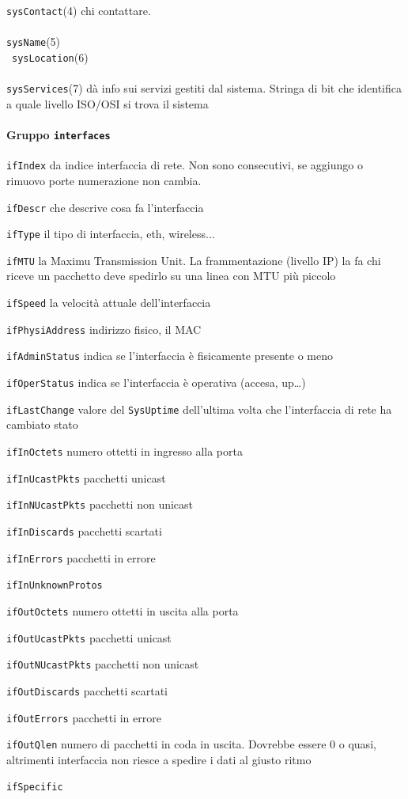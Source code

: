 \documentclass[10pt]{book}
\begin{document}
\texttt{sysContact}(4) chi contattare.\\\\
\texttt{sysName}(5)\\\
\texttt{sysLocation}(6)\\\\
\texttt{sysServices}(7) dà info sui servizi gestiti dal sistema. Stringa di bit che identifica a quale livello ISO/OSI si trova il sistema
\paragraph{Gruppo \texttt{interfaces}}\begin{list}{}{Informazioni sulle interfacce di rete}
	\item \texttt{ifIndex} da indice interfaccia di rete. Non sono consecutivi, se aggiungo o rimuovo porte numerazione non cambia.
	\item \texttt{ifDescr} che descrive cosa fa l'interfaccia 
	\item \texttt{ifType} il tipo di interfaccia, eth, wireless...
	\item \texttt{ifMTU} la Maximu Transmission Unit. La frammentazione (livello IP) la fa chi riceve un pacchetto deve spedirlo su una linea con MTU più piccolo
	\item \texttt{ifSpeed} la velocità attuale dell'interfaccia
	\item \texttt{ifPhysiAddress} indirizzo fisico, il MAC
	\item \texttt{ifAdminStatus} indica se l'interfaccia è fisicamente presente o meno
	\item \texttt{ifOperStatus} indica se l'interfaccia è operativa (accesa, up\ldots)
	\item \texttt{ifLastChange} valore del \texttt{SysUptime} dell'ultima volta che l'interfaccia di rete ha cambiato stato
	\item \texttt{ifInOctets} numero ottetti in ingresso alla porta
	\item \texttt{ifInUcastPkts} pacchetti unicast
	\item \texttt{ifInNUcastPkts} pacchetti non unicast
	\item \texttt{ifInDiscards} pacchetti scartati
	\item \texttt{ifInErrors} pacchetti in errore
	\item \texttt{ifInUnknownProtos}
	\item \texttt{ifOutOctets} numero ottetti in uscita alla porta
	\item \texttt{ifOutUcastPkts} pacchetti unicast
	\item \texttt{ifOutNUcastPkts} pacchetti non unicast
	\item \texttt{ifOutDiscards} pacchetti scartati
	\item \texttt{ifOutErrors} pacchetti in errore
	\item \texttt{ifOutQlen} numero di pacchetti in coda in uscita. Dovrebbe essere 0 o quasi, altrimenti interfaccia non riesce a spedire i dati al giusto ritmo
	\item \texttt{ifSpecific}
\end{list}
\end{document}
